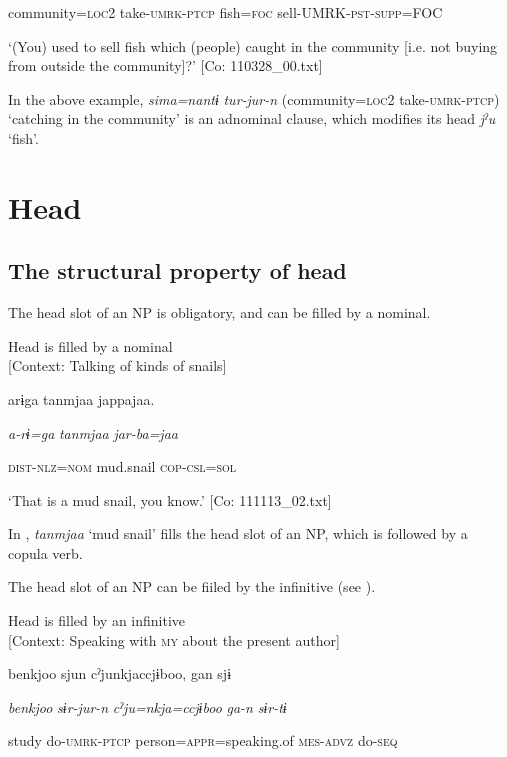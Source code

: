     community=\textsc{loc}2  take-\textsc{umrk}-\textsc{ptcp}  fish=\textsc{foc}  sell-UMRK-\textsc{pst}-\textsc{supp}=FOC

\glt    ‘(You) used to sell fish which (people) caught in the community [i.e. not buying from outside the community]?’ [Co: 110328\_00.txt]
\z

In the above example, \textit{sima=nantɨ} \textit{tur-jur-n} (community=\textsc{loc}2 take-\textsc{umrk}-\textsc{ptcp}) ‘catching in the community’ is an adnominal clause, which modifies its head \textit{jˀu} ‘fish’.

\section{Head}
\subsection{The structural property of head}

The head slot of an NP is obligatory, and can be filled by a nominal.

\ea\label{ex:6-8}
 Head is filled by a nominal\\{}
[Context: Talking of kinds of snails]

{\TM}
\gll arɨga  tanmjaa  jappajaa.

    \textit{a-rɨ=ga}  \textit{tanmjaa}  \textit{jar-ba=jaa}

    \textsc{dist}-\textsc{nlz}=\textsc{nom}  mud.snail  \textsc{cop}-\textsc{csl}=\textsc{sol}

\glt    ‘That is a mud snail, you know.’ [Co: 111113\_02.txt]
\z

In , \textit{tanmjaa} ‘mud snail’ fills the head slot of an NP, which is followed by a copula verb.

The head slot of an NP can be fiiled by the infinitive (see ).

\ea\label{ex:6-9}
 Head is filled by an infinitive\\{}
[Context: Speaking with \textsc{my} about the present author]

{\TM}
\gll {\textbar}benkjoo{\textbar}  sjun  cˀjunkjaccjɨboo,  gan  sjɨ

    \textit{benkjoo}  \textit{sɨr-jur-n}  \textit{cˀju=nkja=ccjɨboo}  \textit{ga-n}  \textit{sɨr-tɨ}

    study  do-\textsc{umrk}-\textsc{ptcp}  person=\textsc{appr}=speaking.of  \textsc{mes}-\textsc{advz}  do-\textsc{seq}

